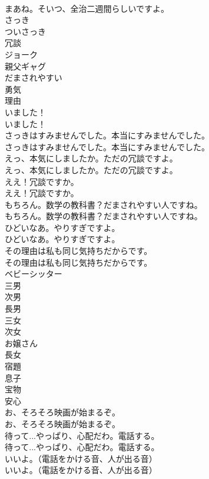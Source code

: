 \documentclass[8pt]{extreport}
\begin{document}
\begin{CJK}{UTF8}{min}
\\	まあね。そいつ、全治二週間らしいですよ。 
\\	さっき
\\	ついさっき
\\	冗談
\\	ジョーク
\\	親父ギャグ
\\	だまされやすい
\\	勇気
\\	理由
\\	いました！	
\\	いました！ 
\\	さっきはすみませんでした。本当にすみませんでした。	
\\	さっきはすみませんでした。本当にすみませんでした。 
\\	えっ、本気にしましたか。ただの冗談ですよ。	
\\	えっ、本気にしましたか。ただの冗談ですよ。 
\\	ええ！冗談ですか。	
\\	ええ！冗談ですか。 
\\	もちろん。数学の教科書？だまされやすい人ですね。	
\\	もちろん。数学の教科書？だまされやすい人ですね。 
\\	ひどいなあ。やりすぎですよ。	
\\	ひどいなあ。やりすぎですよ。 
\\	その理由は私も同じ気持ちだからです。	
\\	その理由は私も同じ気持ちだからです。 
\\	ベビーシッター
\\	三男
\\	次男
\\	長男
\\	三女
\\	次女
\\	お嬢さん
\\	長女
\\	宿題
\\	息子
\\	宝物
\\	安心
\\	お、そろそろ映画が始まるぞ。	
\\	お、そろそろ映画が始まるぞ。 
\\	待って...やっぱり、心配だわ。電話する。	
\\	待って...やっぱり、心配だわ。電話する。 
\\	いいよ。（電話をかける音、人が出る音）	
\\	いいよ。（電話をかける音、人が出る音） 

\end{CJK}
\end{document}
